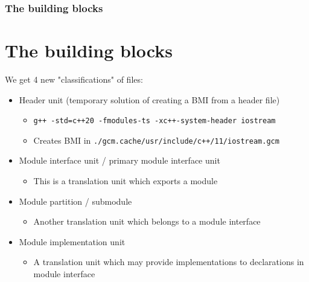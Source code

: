 \documentclass{beamer}
\begin{document}
%
%
\begin{frame}[plain]
\frametitle{The building blocks}
\section{The building blocks}
We get 4 new "classifications" of files:
\begin{itemize}
\item Header unit (temporary solution of creating a BMI from a header file)
\begin{itemize}
\item \texttt{g++ -std=c++20 -fmodules-ts -xc++-system-header iostream}
\item Creates BMI in \texttt{./gcm.cache/usr/include/c++/11/iostream.gcm}
\end{itemize}
\item Module interface unit / primary module interface unit
\begin{itemize}
\item This is a translation unit which exports a module
\end{itemize}
\item Module partition / submodule
\begin{itemize}
\item Another translation unit which belongs to a module interface
\end{itemize}
\item Module implementation unit
\begin{itemize}
\item A translation unit which may provide implementations to declarations
in module interface
\end{itemize}
\end{itemize}
\end{frame}
\end{document}
